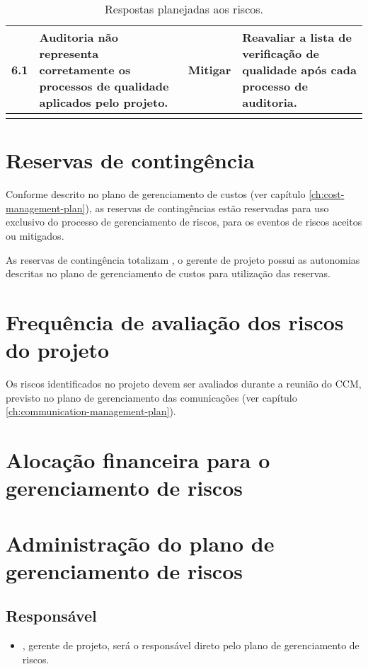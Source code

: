 \begin{longtable}{ c p{} c p{} }
	\midrule
	6.1                      & Auditoria não representa corretamente os processos de qualidade aplicados pelo projeto.                                                                                      & Mitigar                    & Reavaliar a lista de verificação de qualidade após cada processo de auditoria.                                                      \\
	\bottomrule
	\caption{Respostas planejadas aos riscos.}
	\centering
	\label{tab:risk-answers}
\end{longtable}

\section{Reservas de contingência}

Conforme descrito no plano de gerenciamento de custos (ver capítulo \ref{ch:cost-management-plan}), as reservas de contingências estão reservadas para uso exclusivo do processo de gerenciamento de riscos, para os eventos de riscos aceitos ou mitigados.

As reservas de contingência totalizam \contingencyBudget{}, o gerente de projeto possui as autonomias descritas no plano de gerenciamento de custos para utilização das reservas.

\section{Frequência de avaliação dos riscos do projeto}

Os riscos identificados no projeto devem ser avaliados durante a reunião do CCM, previsto no plano de gerenciamento das comunicações (ver capítulo \ref{ch:communication-management-plan}).

\section{Alocação financeira para o gerenciamento de riscos}

\section{Administração do plano de gerenciamento de riscos}

\subsection{Responsável}

\begin{itemize}
	\item \projectManagerName{}, gerente de projeto, será o responsável direto pelo plano de gerenciamento de riscos.
\end{itemize}

